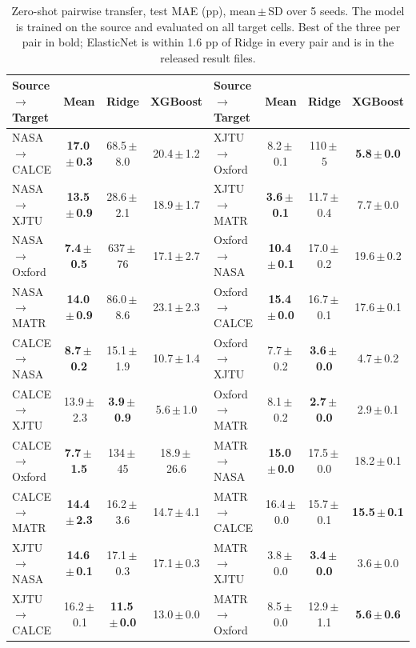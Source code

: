 \documentclass[journal]{IEEEtran}
\begin{document}
\begin{table}[!t]
\caption{Zero-shot pairwise transfer, test MAE (pp), mean\,$\pm$\,SD over 5 seeds. The model is trained on the source and evaluated on all target cells. Best of the three per pair in bold; ElasticNet is within 1.6 pp of Ridge in every pair and is in the released result files.}
\label{tab:cross}
\centering
\scriptsize
\setlength{\tabcolsep}{3.5pt}
\begin{tabular}{lccc@{\hspace{14pt}}lccc}
\toprule
Source$\to$Target & Mean & Ridge & XGBoost & Source$\to$Target & Mean & Ridge & XGBoost \\
\midrule
NASA$\to$CALCE & \textbf{17.0\,$\pm$\,0.3} & 68.5\,$\pm$\,8.0 & 20.4\,$\pm$\,1.2 & XJTU$\to$Oxford & 8.2\,$\pm$\,0.1 & 110\,$\pm$\,5 & \textbf{5.8\,$\pm$\,0.0} \\
NASA$\to$XJTU & \textbf{13.5\,$\pm$\,0.9} & 28.6\,$\pm$\,2.1 & 18.9\,$\pm$\,1.7 & XJTU$\to$MATR & \textbf{3.6\,$\pm$\,0.1} & 11.7\,$\pm$\,0.4 & 7.7\,$\pm$\,0.0 \\
NASA$\to$Oxford & \textbf{7.4\,$\pm$\,0.5} & 637\,$\pm$\,76 & 17.1\,$\pm$\,2.7 & Oxford$\to$NASA & \textbf{10.4\,$\pm$\,0.1} & 17.0\,$\pm$\,0.2 & 19.6\,$\pm$\,0.2 \\
NASA$\to$MATR & \textbf{14.0\,$\pm$\,0.9} & 86.0\,$\pm$\,8.6 & 23.1\,$\pm$\,2.3 & Oxford$\to$CALCE & \textbf{15.4\,$\pm$\,0.0} & 16.7\,$\pm$\,0.1 & 17.6\,$\pm$\,0.1 \\
CALCE$\to$NASA & \textbf{8.7\,$\pm$\,0.2} & 15.1\,$\pm$\,1.9 & 10.7\,$\pm$\,1.4 & Oxford$\to$XJTU & 7.7\,$\pm$\,0.2 & \textbf{3.6\,$\pm$\,0.0} & 4.7\,$\pm$\,0.2 \\
CALCE$\to$XJTU & 13.9\,$\pm$\,2.3 & \textbf{3.9\,$\pm$\,0.9} & 5.6\,$\pm$\,1.0 & Oxford$\to$MATR & 8.1\,$\pm$\,0.2 & \textbf{2.7\,$\pm$\,0.0} & 2.9\,$\pm$\,0.1 \\
CALCE$\to$Oxford & \textbf{7.7\,$\pm$\,1.5} & 134\,$\pm$\,45 & 18.9\,$\pm$\,26.6 & MATR$\to$NASA & \textbf{15.0\,$\pm$\,0.0} & 17.5\,$\pm$\,0.0 & 18.2\,$\pm$\,0.1 \\
CALCE$\to$MATR & \textbf{14.4\,$\pm$\,2.3} & 16.2\,$\pm$\,3.6 & 14.7\,$\pm$\,4.1 & MATR$\to$CALCE & 16.4\,$\pm$\,0.0 & 15.7\,$\pm$\,0.1 & \textbf{15.5\,$\pm$\,0.1} \\
XJTU$\to$NASA & \textbf{14.6\,$\pm$\,0.1} & 17.1\,$\pm$\,0.3 & 17.1\,$\pm$\,0.3 & MATR$\to$XJTU & 3.8\,$\pm$\,0.0 & \textbf{3.4\,$\pm$\,0.0} & 3.6\,$\pm$\,0.0 \\
XJTU$\to$CALCE & 16.2\,$\pm$\,0.1 & \textbf{11.5\,$\pm$\,0.0} & 13.0\,$\pm$\,0.0 & MATR$\to$Oxford & 8.5\,$\pm$\,0.0 & 12.9\,$\pm$\,1.1 & \textbf{5.6\,$\pm$\,0.6} \\
\bottomrule
\end{tabular}
\end{table}
\end{document}
